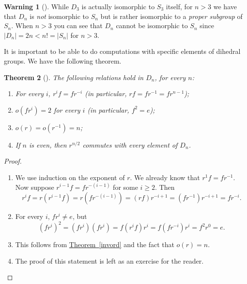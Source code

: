 \documentclass[10pt,openany,oneside]{book}
\theoremstyle{plain}
\newtheorem{theorem}{Theorem}[section]
\theoremstyle{definition}
\theoremstyle{definition}
\newtheorem{warning}[theorem]{Warning}
\theoremstyle{definition}
\theoremstyle{definition}
\numberwithin{equation}{section}
\newcommand{\lt}{<}
\begin{document}
\begin{warning}[]\label{warning-19}
While \(D_3\) is actually isomorphic to \(S_3\) itself, for \(n>3\) we have that \(D_n\) is \emph{not} isomorphic to \(S_n\) but is rather isomorphic to a \emph{proper subgroup} of \(S_n\). When \(n>3\) you can see that \(D_n\) cannot be isomorphic to \(S_n\) since \(|D_n|=2n \lt  n! = |S_n|\) for \(n>3\).%
\end{warning}
It is important to be able to do computations with specific elements of dihedral groups. We have the following theorem.%
\begin{theorem}[{}]\label{diords}
The following relations hold in \(D_n\), for every \(n\): \leavevmode%
\begin{enumerate}
\item\hypertarget{li-350}{}For every \(i\), \(r^if=fr^{-i}\) (in particular, \(rf=fr^{-1}=fr^{n-1}\));%
\item\hypertarget{li-351}{}\(o(fr^i)=2\) for every \(i\) (in particular, \(f^2=e\));%
\item\hypertarget{li-352}{}\(o(r)=o(r^{-1})=n\);%
\item\hypertarget{li-353}{}If \(n\) is even, then \(r^{n/2}\) commutes with every element of \(D_n\).%
\end{enumerate}
%
\end{theorem}
\begin{proof}\hypertarget{proof-32}{}
\leavevmode%
\begin{enumerate}
\item\hypertarget{li-354}{}We use induction on the exponent of \(r\). We already know that \(r^1f=fr^{-1}\).  Now suppose \(r^{i-1}f=fr^{-(i-1)}\) for some \(i\geq 2\).  Then%
\begin{equation*}
r^if=r(r^{i-1}f)=r(fr^{-(i-1)})=(rf)r^{-i+1}=(fr^{-1})r^{-i+1}=fr^{-i}.
\end{equation*}
%
\item\hypertarget{li-355}{}For every \(i\), \(fr^i\neq e\), but%
\begin{equation*}
(fr^i)^2=(fr^i)(fr^i)=f(r^if)r^i=f(fr^{-i})r^i=f^2r^0=e.
\end{equation*}
%
\item\hypertarget{li-356}{}This follows from \hyperref[invord]{Theorem~\ref{invord}} and the fact that \(o(r)=n\).%
\item\hypertarget{li-357}{}The proof of this statement is left as an exercise for the reader.%
\end{enumerate}
%
\end{proof}
\end{document}
